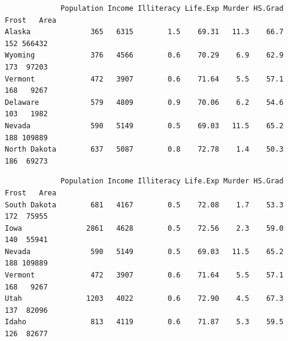 \documentclass[
]{book}
\newenvironment{Shaded}{\begin{snugshade}}{\end{snugshade}}
\newcommand{\CommentTok}[1]{\textcolor[rgb]{0.56,0.35,0.01}{\textit{#1}}}
\newcommand{\KeywordTok}[1]{\textcolor[rgb]{0.13,0.29,0.53}{\textbf{#1}}}
\newcommand{\NormalTok}[1]{#1}
\newcommand{\OperatorTok}[1]{\textcolor[rgb]{0.81,0.36,0.00}{\textbf{#1}}}
\newcommand{\StringTok}[1]{\textcolor[rgb]{0.31,0.60,0.02}{#1}}
\begin{document}
\begin{Shaded}
\end{Shaded}

\begin{verbatim}
             Population Income Illiteracy Life.Exp Murder HS.Grad Frost   Area
Alaska              365   6315        1.5    69.31   11.3    66.7   152 566432
Wyoming             376   4566        0.6    70.29    6.9    62.9   173  97203
Vermont             472   3907        0.6    71.64    5.5    57.1   168   9267
Delaware            579   4809        0.9    70.06    6.2    54.6   103   1982
Nevada              590   5149        0.5    69.03   11.5    65.2   188 109889
North Dakota        637   5087        0.8    72.78    1.4    50.3   186  69273
\end{verbatim}

\begin{Shaded}
\end{Shaded}

\begin{verbatim}
             Population Income Illiteracy Life.Exp Murder HS.Grad Frost   Area
South Dakota        681   4167        0.5    72.08    1.7    53.3   172  75955
Iowa               2861   4628        0.5    72.56    2.3    59.0   140  55941
Nevada              590   5149        0.5    69.03   11.5    65.2   188 109889
Vermont             472   3907        0.6    71.64    5.5    57.1   168   9267
Utah               1203   4022        0.6    72.90    4.5    67.3   137  82096
Idaho               813   4119        0.6    71.87    5.3    59.5   126  82677
\end{verbatim}

\begin{Shaded}
\end{Shaded}
\end{document}
